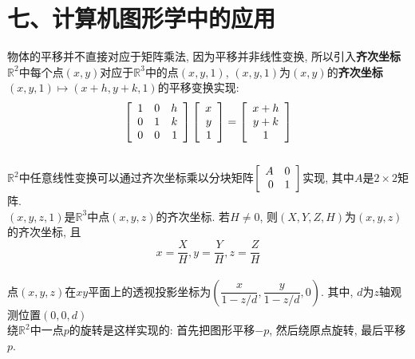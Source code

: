\section{七、计算机图形学中的应用}
物体的平移并不直接对应于矩阵乘法, 因为平移并非线性变换, 所以引入\textbf{齐次坐标}\\[1ex]
$\mathbb{R}^2$中每个点$(x,y)$对应于$\mathbb{R}^3$中的点$(x,y,1)$, $(x,y,1)$为$(x,y)$的\textbf{齐次坐标}\\[1ex]
$(x,y,1)\mapsto(x+h,y+k,1)$的平移变换实现:\\
\[\left[\begin{array}{r r r}
1 & 0 & h\\
0 & 1 & k\\
0 & 0 & 1
\end{array}\right]
\left[\begin{array}{r}
x\\
y\\
1
\end{array}\right]=
\left[\begin{array}{c}
x+h\\
y+k\\
1
\end{array}\right]\]\\[2ex]
$\mathbb{R}^2$中任意线性变换可以通过齐次坐标乘以分块矩阵$\left[\begin{array}{r r}A & 0\\0 & 1\end{array}\right]$实现, 其中$A$是$2\times 2$矩阵.\\[2ex]
$(x,y,z,1)$是$\mathbb{R}^3$中点$(x,y,z)$的齐次坐标. 若$H\neq 0$, 则$(X,Y,Z,H)$为$(x,y,z)$的齐次坐标, 且
\[x=\frac{X}{H},y=\frac{Y}{H},z=\frac{Z}{H}\]\\[1ex]
点$(x,y,z)$在$xy$平面上的透视投影坐标为$(\dfrac{x}{1-z/d}, \dfrac{y}{1-z/d}, 0)$. 其中, $d$为$z$轴观测位置$(0,0,d)$\\[2ex]
绕$\mathbb{R}^2$中一点$p$的旋转是这样实现的: 首先把图形平移$-p$, 然后绕原点旋转, 最后平移$p$.
